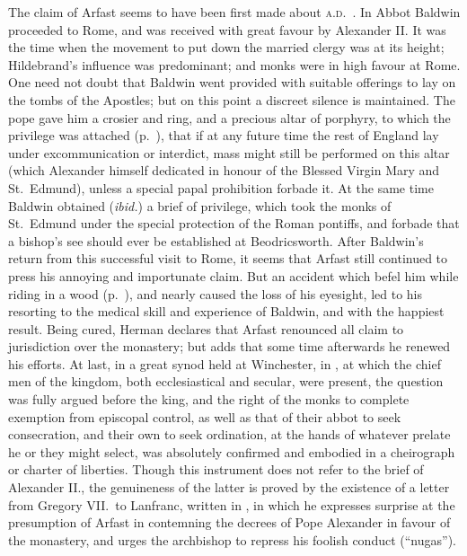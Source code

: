 \documentclass[10pt]{book}
\begin{document}
{The claim of Arfast seems to have been first made about \textsc{a.d}.\ . In  Abbot Baldwin proceeded to Rome, and was received with great favour by Alexander II. It was the time when the movement to put down the married clergy was at its height; Hildebrand's influence was predominant; and monks were in high favour at Rome. One need not doubt that Baldwin went provided with suitable offerings to lay on the tombs of the Apostles; but on this point a discreet silence is maintained. The pope gave him a crosier and ring, and a precious altar of porphyry, to which the privilege was attached (p.\ ), that if at any future time the rest of England lay under excommunication or interdict, mass might still be performed on this altar (which Alexander himself dedicated in honour of the Blessed Virgin Mary and St.\ Edmund), unless a special papal prohibition forbade it. At the same time Baldwin obtained (\emph{ibid.}) a brief of privilege, which took the monks of St.\ Edmund under the special protection of the Roman pontiffs, and forbade that a bishop's see should ever be established at Beodricsworth. After Baldwin's return from this successful visit to Rome, it seems that Arfast still continued to press his annoying and importunate claim. But an accident which befel him while riding in a wood (p.\ ), and nearly caused the loss of his eyesight, led to his resorting to the medical skill and experience of Baldwin, and with the happiest result. Being cured, Herman declares that Arfast renounced all claim to jurisdiction over the monastery; but adds that some time afterwards he renewed his efforts. At last, in a great synod held at Winchester, in , at which the chief men of the kingdom, both ecclesiastical and secular, were present, the question was fully argued before the king, and the right of the monks to complete exemption from episcopal control, as well as that of their abbot to seek consecration, and their own to seek ordination, at the hands of whatever prelate he or they might select, was absolutely confirmed and embodied in a cheirograph or charter of liberties. Though this instrument does not refer to the brief of Alexander II., the genuineness of the latter is proved by the existence of a letter from Gregory VII.\ to Lanfranc, written in , in which he expresses surprise at the presumption of Arfast in contemning the decrees of Pope Alexander in favour of the monastery, and urges the archbishop to repress his foolish conduct (``nugas'').

}
\end{document}
